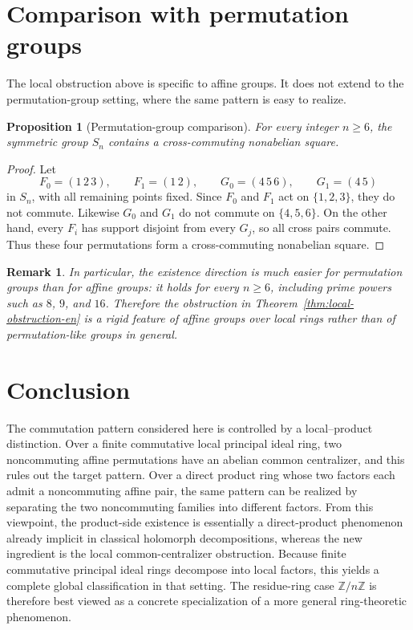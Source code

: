 \documentclass[11pt]{article}
\newcommand{\Z}{\mathbb{Z}}
\theoremstyle{uprightthm}
\newtheorem{proposition}[theorem]{Proposition}
\newtheorem{remark}[theorem]{Remark}
\begin{document}
\section{Comparison with permutation groups}
The local obstruction above is specific to affine groups. It does not extend to
the permutation-group setting, where the same pattern is easy to realize.

\begin{proposition}[Permutation-group comparison]
\label{prop:gpm-comparison-en}
For every integer $n\ge 6$, the symmetric group $S_n$ contains a
cross-commuting nonabelian square.
\end{proposition}

\begin{proof}
Let
\[
F_0=(1\,2\,3),\qquad F_1=(1\,2),\qquad
G_0=(4\,5\,6),\qquad G_1=(4\,5)
\]
in $S_n$, with all remaining points fixed. Since $F_0$ and $F_1$ act on
$\{1,2,3\}$, they do not commute. Likewise $G_0$ and $G_1$ do not commute on
$\{4,5,6\}$. On the other hand, every $F_i$ has support disjoint from every
$G_j$, so all cross pairs commute. Thus these four permutations form a
cross-commuting nonabelian square.
\end{proof}

\begin{remark}
In particular, the existence direction is much easier for permutation groups
than for affine groups: it holds for every $n\ge 6$, including prime powers
such as $8$, $9$, and $16$. Therefore the obstruction in
Theorem~\ref{thm:local-obstruction-en} is a rigid feature of affine groups over
local rings rather than of permutation-like groups in general.
\end{remark}

\section{Conclusion}
The commutation pattern considered here is controlled by a local--product
distinction. Over a finite commutative local principal ideal ring, two
noncommuting affine permutations have an abelian common centralizer, and this
rules out the target pattern. Over a direct product ring whose two factors each
admit a noncommuting affine pair, the same pattern can be realized by
separating the two noncommuting families into different factors. From this
viewpoint, the product-side existence is essentially a direct-product phenomenon
already implicit in classical holomorph decompositions, whereas the new
ingredient is the local common-centralizer obstruction. Because finite
commutative principal ideal rings decompose into local factors, this yields a
complete global classification in that setting. The residue-ring case
$\Z/n\Z$ is therefore best viewed as a concrete specialization of a more
general ring-theoretic phenomenon.
\end{document}
